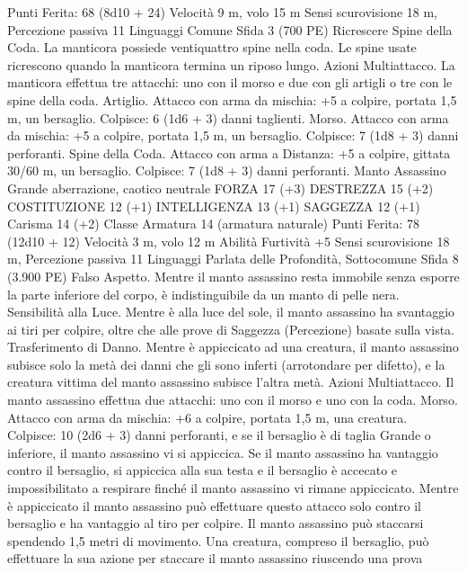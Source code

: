 \begin{multicols}{2}
\hspace*{0pt}\hfill{Punti Ferita}: 68 (8d10 + 24)
Velocità 9 m, volo 15 m
Sensi scurovisione 18 m, Percezione passiva 11
Linguaggi Comune
Sfida 3 (700 PE)
Ricrescere Spine della Coda. La manticora possiede ventiquattro
spine nella coda. Le spine usate ricrescono quando la manticora
termina un riposo lungo.
Azioni
Multiattacco. La manticora effettua tre attacchi: uno con il
morso e due con gli artigli o tre con le spine della coda.
Artiglio. Attacco con arma da mischia: +5 a colpire, portata 1,5
m, un bersaglio.
Colpisce: 6 (1d6 + 3) danni taglienti.
Morso. Attacco con arma da mischia: +5 a colpire, portata 1,5
m, un bersaglio.
Colpisce: 7 (1d8 + 3) danni perforanti.
Spine della Coda. Attacco con arma a Distanza: +5 a colpire,
gittata 30/60 m, un bersaglio.
Colpisce: 7 (1d8 + 3) danni perforanti.
Manto Assassino
Grande aberrazione, caotico neutrale
FORZA 17 (+3)
DESTREZZA 15 (+2)
COSTITUZIONE 12 (+1)
INTELLIGENZA 13 (+1)
SAGGEZZA 12 (+1)
Carisma 14 (+2)
Classe Armatura 14 (armatura naturale)
\hspace*{0pt}\hfill{Punti Ferita}: 78 (12d10 + 12)
Velocità 3 m, volo 12 m
Abilità Furtività +5
Sensi scurovisione 18 m, Percezione passiva 11
Linguaggi Parlata delle Profondità, Sottocomune
Sfida 8 (3.900 PE)
Falso Aspetto. Mentre il manto assassino resta immobile senza
esporre la parte inferiore del corpo, è indistinguibile da un manto
di pelle nera.
Sensibilità alla Luce. Mentre è alla luce del sole, il manto
assassino ha svantaggio ai tiri per colpire, oltre che alle prove di
Saggezza (Percezione) basate sulla vista.
Trasferimento di Danno. Mentre è appiccicato ad una creatura,
il manto assassino subisce solo la metà dei danni che gli sono
inferti (arrotondare per difetto), e la creatura vittima del manto
assassino subisce l’altra metà.
Azioni
Multiattacco. Il manto assassino effettua due attacchi: uno con il
morso e uno con la coda.
Morso. Attacco con arma da mischia: +6 a colpire, portata 1,5
m, una creatura.
Colpisce: 10 (2d6 + 3) danni perforanti, e se il bersaglio è di
taglia Grande o inferiore, il manto assassino vi si appiccica. Se il
manto assassino ha vantaggio contro il bersaglio, si appiccica
alla sua testa e il bersaglio è accecato e impossibilitato a
respirare finché il manto assassino vi rimane appiccicato. Mentre
è appiccicato il manto assassino può effettuare questo attacco
solo contro il bersaglio e ha vantaggio al tiro per colpire. Il
manto assassino può staccarsi spendendo 1,5 metri di
movimento. Una creatura, compreso il bersaglio, può effettuare
la sua azione per staccare il manto assassino riuscendo una prova

\end{multicols}
